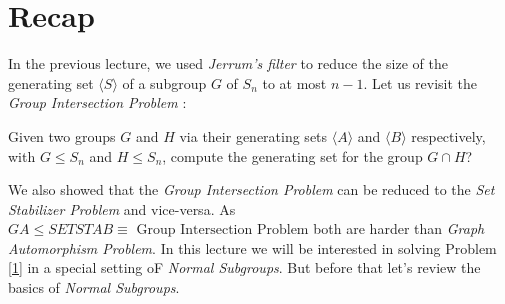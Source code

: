 
\section{Recap}
In the previous lecture, we used \emph{Jerrum's filter} to reduce the size of the generating set $\langle S\rangle$ of a subgroup $G$ of $S_n$ to at most $n-1$. Let us revisit the \emph{Group Intersection Problem} :
\begin{problem}\label{1}
	Given two groups $G$ and $H$ via their generating sets $\langle A\rangle$ and $\langle B\rangle$ respectively, with $G\leq S_n$ and $H\leq S_n$, compute the generating set for the group $G\cap H$?
\end{problem}
We also showed that the \emph{Group Intersection Problem} can be reduced to the \emph{Set Stabilizer Problem} and vice-versa. As $GA\leq SETSTAB \equiv\text{ Group Intersection Problem}$ both are harder than \emph{Graph Automorphism Problem}. In this lecture we will be interested in solving Problem \ref{1} in a special setting oF \emph{Normal Subgroups}. But before that let's review the basics of \emph{Normal Subgroups}.

